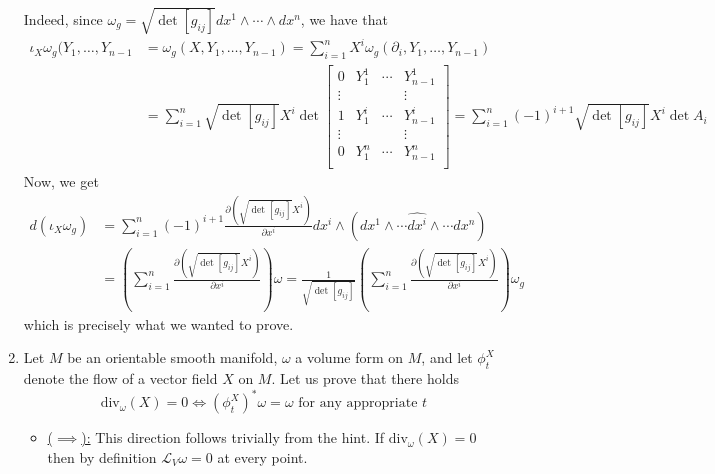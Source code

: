 \documentclass[a4paper, 12pt]{article}
\begin{document}
\begin{Exercise}
\begin{enumerate}[label=(\roman*)]
            Indeed, since $\omega_g = \sqrt{\det[g_{ij}]}dx^1\wedge\cdots\wedge dx^n$,
            we have that
            \begin{align*}
                \iota_X\omega_g(Y_1,\dots,Y_{n-1}
                &= \omega_g(X, Y_1,\dots,Y_{n-1})
                = \sum_{i = 1}^{n}X^i\omega_g(\partial_i,Y_1,\dots,Y_{n-1}) \\
                &= \sum_{i = 1}^{n}\sqrt{\det[g_{ij}]}X^i \det
                \begin{bmatrix}
                    0 & Y_1^1 & \cdots & Y_{n-1}^1 \\
                    \vdots &  & & \vdots \\
                    1 & Y_1^i & \cdots & Y_{n-1}^i \\
                    \vdots &  & & \vdots \\
                    0 & Y_1^n & \cdots & Y_{n-1}^n \\
                \end{bmatrix}
                = \sum_{i=1}^{n}(-1)^{i+1}\sqrt{\det[g_{ij}]}X^i \det A_i
            \end{align*}
            Now, we get
            \begin{align*}
                d(\iota_X\omega_g)
                &= \sum_{i=1}^{n}(-1)^{i+1}\frac{\partial (\sqrt{\det[g_{ij}]}X^i)}{\partial x^i}dx^i\wedge (dx^1\wedge \cdots \hat{dx^i}\wedge\cdots dx^n) \\
                &= \left( \sum_{i=1}^{n}\frac{\partial (\sqrt{\det[g_{ij}]} X^i)}{\partial x^i} \right) \omega
                = \frac{1}{\sqrt{\det[g_{ij}]}}\left( \sum_{i=1}^{n}\frac{\partial (\sqrt{\det[g_{ij}]} X^i)}{\partial x^i} \right) \omega_g
            \end{align*}
            which is precisely what we wanted to prove.
        \item Let $M$ be an orientable smooth manifold, $\omega$ a volume form on $M$,
            and let $\phi_t^X$ denote the flow of a vector field $X$ on $M$.
            Let us prove that there holds
            \[
                \text{div}_\omega(X) = 0 \iff (\phi_t^X)^*\omega = \omega \text{ for any appropriate $t$}
            \]
            \begin{itemize}
                \item \underline{($\implies$):}
                    This direction follows trivially from the hint.
                    If $\text{div}_\omega(X) = 0$ then by definition $\mathcal{L}_V\omega = 0$ at every point.

\end{itemize}
\end{enumerate}
\end{Exercise}
\end{document}
